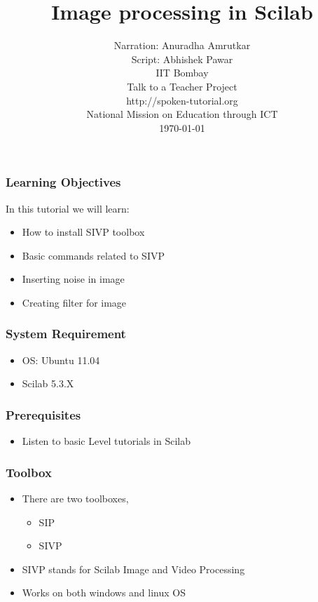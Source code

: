 \documentclass[17pt]{beamer}
\begin{document}
\sffamily \bfseries
\title
[Image processing in Scilab
\hspace{1cm}
\insertframenumber/\inserttotalframenumber]
{\normalsize Image processing in Scilab}
\author
[Abhishek Pawar]
{\small  Narration: Anuradha Amrutkar \\ Script: Abhishek Pawar\\ IIT Bombay \\ [0.25in]
Talk to a Teacher Project \\ http://spoken-tutorial.org \\
  National Mission on Education through ICT \\ 
 \today}
\date{}




\begin{frame}
\maketitle
\end{frame}

\begin{frame}
\frametitle{Learning Objectives}
In this tutorial we will learn:
\begin{itemize} [<+-|alert@+>]
\item How to install SIVP toolbox
\item Basic commands related to SIVP
\item Inserting noise in image
\item Creating filter for image
\end{itemize}
\end{frame}



\begin{frame}
\frametitle{System Requirement}
\begin{itemize}[<+-|alert@+>]
\item OS: Ubuntu 11.04 
\item Scilab 5.3.X
\end{itemize}
\end{frame}


\begin{frame}
\frametitle{Prerequisites}
\begin{itemize}[<+-|alert@+>]
\item Listen to basic Level tutorials in Scilab
\end{itemize}
\end{frame}

\begin{frame}
\frametitle{Toolbox}
\begin{itemize} [<+-|alert@+>]
\item There are two toolboxes,
\begin{itemize}
\item SIP
\item SIVP
\end{itemize}
\item SIVP stands for Scilab Image and Video Processing
\item Works on both windows and linux OS
\end{itemize}
\end{frame}
\end{document}
